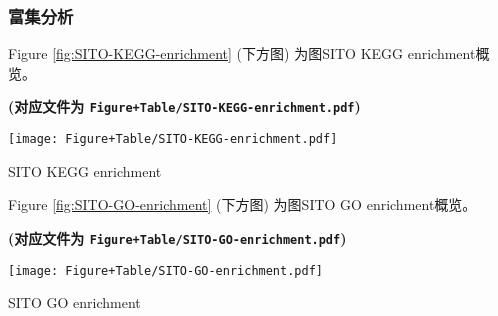 \documentclass[
]{article}
\begin{document}
\hypertarget{ux5bccux96c6ux5206ux6790-1}{%
\subsubsection{富集分析}\label{ux5bccux96c6ux5206ux6790-1}}

\begin{center}\vspace{1.5cm}\end{center}

Figure \ref{fig:SITO-KEGG-enrichment} (下方图) 为图SITO KEGG enrichment概览。

\textbf{(对应文件为 \texttt{Figure+Table/SITO-KEGG-enrichment.pdf})}

\def\@captype{figure}
\begin{center}
\texttt{[image: Figure+Table/SITO-KEGG-enrichment.pdf]}
\caption{SITO KEGG enrichment}\label{fig:SITO-KEGG-enrichment}
\end{center}

\begin{center}\vspace{1.5cm}\end{center}

\begin{center}\vspace{1.5cm}\end{center}

Figure \ref{fig:SITO-GO-enrichment} (下方图) 为图SITO GO enrichment概览。

\textbf{(对应文件为 \texttt{Figure+Table/SITO-GO-enrichment.pdf})}

\def\@captype{figure}
\begin{center}
\texttt{[image: Figure+Table/SITO-GO-enrichment.pdf]}
\caption{SITO GO enrichment}\label{fig:SITO-GO-enrichment}
\end{center}

\begin{center}\vspace{1.5cm}\end{center}

\begin{center}\vspace{1.5cm}\end{center}
\end{document}
